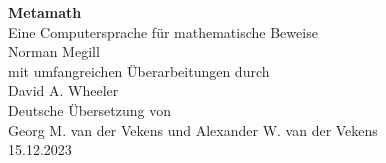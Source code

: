 %
%
%
%


\pagestyle{headings}

\thispagestyle{empty}

\hfill
\vfill

\begin{center}
{\LARGE\bf Metamath} \\
\vspace{1ex}
{\large Eine Computersprache für mathematische Beweise} \\
\vspace{7ex}
{\large Norman Megill} \\
\vspace{7ex}
mit umfangreichen Überarbeitungen durch \\
\vspace{1ex}
{\large David A. Wheeler} \\
\vspace{7ex}
Deutsche Übersetzung von \\
\vspace{1ex}
{\large Georg M. van der Vekens und Alexander W. van der Vekens} \\
\vspace{7ex}
15.12.2023
\end{center}

\vfill
\hfill

\newpage
\thispagestyle{empty}

\hfill
\vfill

